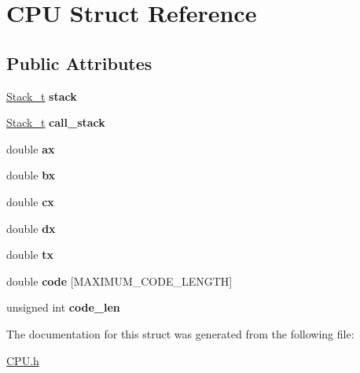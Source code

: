 \hypertarget{structCPU}{\section{C\-P\-U Struct Reference}
\label{structCPU}
}
\subsection*{Public Attributes}
\begin{DoxyCompactItemize}
\item 
\hypertarget{structCPU_ad330afcc391d83e80ea7aa0cafc5424a}{\hyperlink{structStack}{Stack\-\_\-t} {\bfseries stack}}\label{structCPU_ad330afcc391d83e80ea7aa0cafc5424a}

\item 
\hypertarget{structCPU_ac44c62c72a34c2805eb472ad57f70797}{\hyperlink{structStack}{Stack\-\_\-t} {\bfseries call\-\_\-stack}}\label{structCPU_ac44c62c72a34c2805eb472ad57f70797}

\item 
\hypertarget{structCPU_a79afb16a69e41d2e80976b9df3122cab}{double {\bfseries ax}}\label{structCPU_a79afb16a69e41d2e80976b9df3122cab}

\item 
\hypertarget{structCPU_a3578d4b9a2a5f77b459cbe3079e92ef8}{double {\bfseries bx}}\label{structCPU_a3578d4b9a2a5f77b459cbe3079e92ef8}

\item 
\hypertarget{structCPU_ab7910da51f8f58eba6bc1b72a4aa4760}{double {\bfseries cx}}\label{structCPU_ab7910da51f8f58eba6bc1b72a4aa4760}

\item 
\hypertarget{structCPU_ac9ae469da674e0e1139ed42174c05398}{double {\bfseries dx}}\label{structCPU_ac9ae469da674e0e1139ed42174c05398}

\item 
\hypertarget{structCPU_a36f7386dddf5fd935772c44301075a89}{double {\bfseries tx}}\label{structCPU_a36f7386dddf5fd935772c44301075a89}

\item 
\hypertarget{structCPU_aaa39dfeecffef7227649db73be0d898f}{double {\bfseries code} \mbox{[}M\-A\-X\-I\-M\-U\-M\-\_\-\-C\-O\-D\-E\-\_\-\-L\-E\-N\-G\-T\-H\mbox{]}}\label{structCPU_aaa39dfeecffef7227649db73be0d898f}

\item 
\hypertarget{structCPU_a5c6dd36ef17a8622747cb26809decddc}{unsigned int {\bfseries code\-\_\-len}}\label{structCPU_a5c6dd36ef17a8622747cb26809decddc}

\end{DoxyCompactItemize}


The documentation for this struct was generated from the following file\-:\begin{DoxyCompactItemize}
\item 
\hyperlink{CPU_8h}{C\-P\-U.\-h}\end{DoxyCompactItemize}
